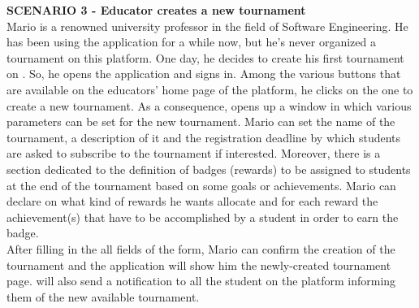     \textbf{SCENARIO 3 - Educator creates a new tournament}\\
    Mario is a renowned university professor in the field of Software Engineering. He has been using the \app application for a while now, but he's never organized a tournament on this platform.
    One day, he decides to create his first tournament on \app. So, he opens the application and signs in. Among the various buttons that are available on the educators' home page of the platform, he clicks on the one to create a new tournament. As a consequence, \app opens up a window in which various parameters can be set for the new tournament. Mario can set the name of the tournament, a description of it and the registration deadline by which students are asked to subscribe to the tournament if interested. Moreover, there is a section dedicated to the definition of badges (rewards) to be assigned to students at the end of the tournament based on some goals or achievements. Mario can declare on \app what kind of rewards he wants allocate and for each reward the achievement(s) that have to be accomplished by a student in order to earn the badge.\\
    After filling in the all fields of the form, Mario can confirm the creation of the tournament and the application will show him the newly-created tournament page.
    \app will also send a notification to all the student on the platform informing them of the new available tournament.\\

